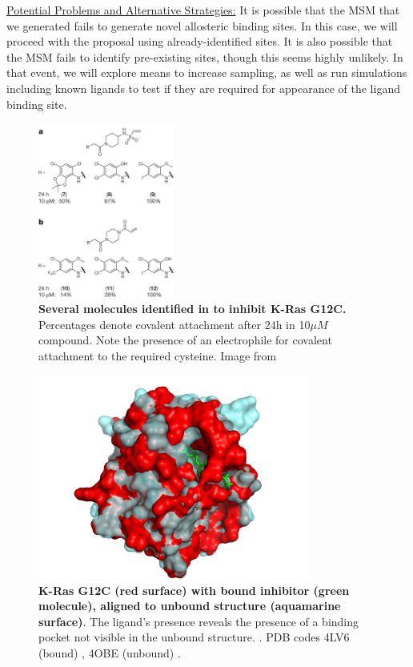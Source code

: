 \documentclass[12pt]{article}
\begin{document}
 \underline{Potential Problems and Alternative Strategies:} It is possible that the MSM that we generated fails to generate novel allosteric binding sites. In this case, we will proceed with the proposal using already-identified sites. It is also possible that the MSM fails to identify pre-existing sites, though this seems highly unlikely. In that event, we will explore means to increase sampling, as well as run simulations including known ligands to test if they are required for appearance of the ligand binding site. 
  
  \begin{figure}[H]
  \centering
  \includegraphics[width=0.4\textwidth]{shokat_mols.png}
  \caption{\textbf{Several molecules identified in \cite{ostrem2013} to inhibit K-Ras G12C.} Percentages denote covalent attachment after 24h in 10$\mu M$ compound. Note the presence of an electrophile for covalent attachment to the required cysteine. Image from \cite{ostrem2013}}
  \label{shokat_mols}
  \end{figure}
  
  \begin{figure}[H]
  \centering
  \includegraphics[width=0.8\textwidth]{ras_pocket.png}
  \caption{\textbf{K-Ras G12C (red surface) with bound inhibitor (green molecule), aligned to unbound structure (aquamarine surface)}. The ligand's presence reveals the presence of a binding pocket not visible in the unbound structure. \cite{ostrem2013}. PDB codes 4LV6 (bound) \cite{ostrem2013}, 4OBE (unbound) \cite{4OBEcite}.}
  \label{shokatfig}
  \end{figure} 
\end{document}
